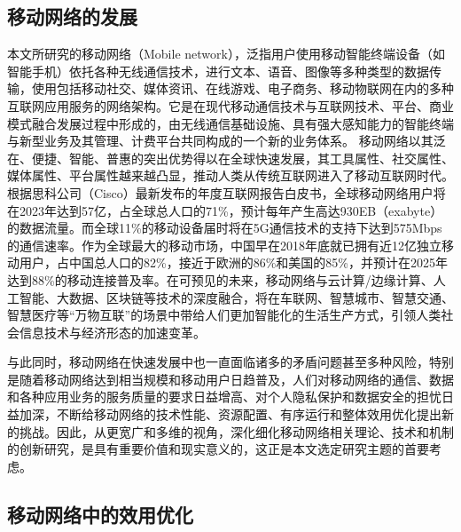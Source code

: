 \subsection{移动网络的发展}

本文所研究的移动网络（Mobile network），泛指用户使用移动智能终端设备（如智能手机）依托各种无线通信技术，进行文本、语音、图像等多种类型的数据传输，使用包括移动社交、媒体资讯、在线游戏、电子商务、移动物联网在内的多种互联网应用服务的网络架构。它是在现代移动通信技术与互联网技术、平台、商业模式融合发展过程中形成的，由无线通信基础设施、具有强大感知能力的智能终端与新型业务及其管理、计费平台共同构成的一个新的业务体系。
移动网络以其泛在、便捷、智能、普惠的突出优势得以在全球快速发展，其工具属性、社交属性、媒体属性、平台属性越来越凸显，推动人类从传统互联网进入了移动互联网时代。
根据思科公司（Cisco）最新发布的年度互联网报告白皮书\cite{Cisco2023}，全球移动网络用户将在2023年达到57亿，占全球总人口的71\%，预计每年产生高达930EB（exabyte）的数据流量。而全球11\%的移动设备届时将在5G通信技术的支持下达到575Mbps的通信速率。作为全球最大的移动市场，中国早在2018年底就已拥有近12亿独立移动用户，占中国总人口的82\%，接近于欧洲的86\%和美国的85\%，并预计在2025年达到88\%的移动连接普及率\cite{GSMA}。在可预见的未来，移动网络与云计算/边缘计算、人工智能、大数据、区块链等技术的深度融合，将在车联网、智慧城市、智慧交通、智慧医疗等“万物互联”的场景中带给人们更加智能化的生活生产方式，引领人类社会信息技术与经济形态的加速变革。

与此同时，移动网络在快速发展中也一直面临诸多的矛盾问题甚至多种风险，特别是随着移动网络达到相当规模和移动用户日趋普及，人们对移动网络的通信、数据和各种应用业务的服务质量的要求日益增高、对个人隐私保护和数据安全的担忧日益加深，不断给移动网络的技术性能、资源配置、有序运行和整体效用优化提出新的挑战。因此，从更宽广和多维的视角，深化细化移动网络相关理论、技术和机制的创新研究，是具有重要价值和现实意义的，这正是本文选定研究主题的首要考虑。


\subsection{移动网络中的效用优化}

